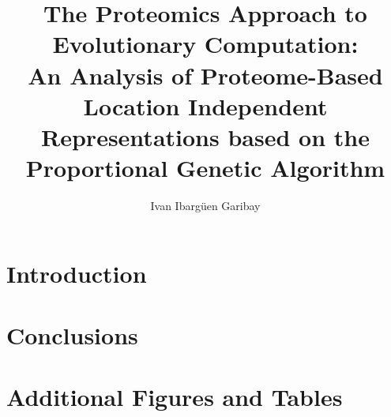 \documentclass [PhD] {ucfthes}
\title          {The Proteomics Approach to
		Evolutionary Computation:\\
		An Analysis of Proteome-Based Location Independent Representations based 
on the Proportional Genetic Algorithm}
\author         {Ivan Ibarg\"{u}en Garibay}
\begin{document}
\makeintropages


\chapter{Introduction}

\chapter{Conclusions}



\appendix

\chapter{Additional Figures and Tables}

\end{document}
